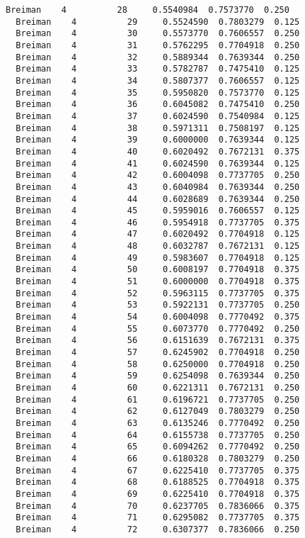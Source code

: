 \documentclass[11pt]{article}
\begin{document}
\begin{Verbatim}[commandchars=\\\{\}]
  Breiman    4          28     0.5540984  0.7573770  0.250
  Breiman    4          29     0.5524590  0.7803279  0.125
  Breiman    4          30     0.5573770  0.7606557  0.250
  Breiman    4          31     0.5762295  0.7704918  0.250
  Breiman    4          32     0.5889344  0.7639344  0.250
  Breiman    4          33     0.5782787  0.7475410  0.125
  Breiman    4          34     0.5807377  0.7606557  0.125
  Breiman    4          35     0.5950820  0.7573770  0.125
  Breiman    4          36     0.6045082  0.7475410  0.250
  Breiman    4          37     0.6024590  0.7540984  0.125
  Breiman    4          38     0.5971311  0.7508197  0.125
  Breiman    4          39     0.6000000  0.7639344  0.125
  Breiman    4          40     0.6020492  0.7672131  0.375
  Breiman    4          41     0.6024590  0.7639344  0.125
  Breiman    4          42     0.6004098  0.7737705  0.250
  Breiman    4          43     0.6040984  0.7639344  0.250
  Breiman    4          44     0.6028689  0.7639344  0.250
  Breiman    4          45     0.5959016  0.7606557  0.125
  Breiman    4          46     0.5954918  0.7737705  0.375
  Breiman    4          47     0.6020492  0.7704918  0.125
  Breiman    4          48     0.6032787  0.7672131  0.125
  Breiman    4          49     0.5983607  0.7704918  0.125
  Breiman    4          50     0.6008197  0.7704918  0.375
  Breiman    4          51     0.6000000  0.7704918  0.375
  Breiman    4          52     0.5963115  0.7737705  0.375
  Breiman    4          53     0.5922131  0.7737705  0.250
  Breiman    4          54     0.6004098  0.7770492  0.375
  Breiman    4          55     0.6073770  0.7770492  0.250
  Breiman    4          56     0.6151639  0.7672131  0.375
  Breiman    4          57     0.6245902  0.7704918  0.250
  Breiman    4          58     0.6250000  0.7704918  0.250
  Breiman    4          59     0.6254098  0.7639344  0.250
  Breiman    4          60     0.6221311  0.7672131  0.250
  Breiman    4          61     0.6196721  0.7737705  0.250
  Breiman    4          62     0.6127049  0.7803279  0.250
  Breiman    4          63     0.6135246  0.7770492  0.250
  Breiman    4          64     0.6155738  0.7737705  0.250
  Breiman    4          65     0.6094262  0.7770492  0.250
  Breiman    4          66     0.6180328  0.7803279  0.250
  Breiman    4          67     0.6225410  0.7737705  0.375
  Breiman    4          68     0.6188525  0.7704918  0.375
  Breiman    4          69     0.6225410  0.7704918  0.375
  Breiman    4          70     0.6237705  0.7836066  0.375
  Breiman    4          71     0.6295082  0.7737705  0.375
  Breiman    4          72     0.6307377  0.7836066  0.250

\end{Verbatim}
\end{document}
